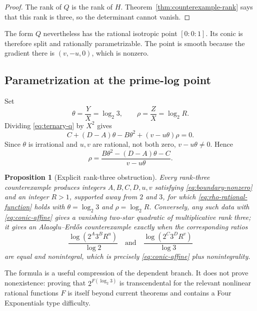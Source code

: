 \documentclass[11pt]{article}
\newtheorem{proposition}[theorem]{Proposition}
\theoremstyle{definition}
\theoremstyle{remark}
\begin{document}
\begin{proof}
The rank of $Q$ is the rank of $H$.  Theorem~\ref{thm:counterexample-rank} says that this rank
is three, so the determinant cannot vanish.
\end{proof}

The form $Q$ nevertheless has the rational isotropic point $[0:0:1]$.  Its conic is therefore
split and rationally parametrizable.  The point is smooth because the gradient there is
$(v,-u,0)$, which is nonzero.

\subsection{Parametrization at the prime-log point}

Set
\[
 \theta=\frac{Y}{X}=\log_2 3,
 \qquad
 \rho=\frac{Z}{X}=\log_2 R.
\]
Dividing \eqref{eq:ternary-q} by $X^2$ gives
\begin{equation}
 C+(D-A)\theta-B\theta^2+(v-u\theta)\rho=0.
 \label{eq:conic-affine}
\end{equation}
Since $\theta$ is irrational and $u,v$ are rational, not both zero,
$v-u\theta\ne0$.  Hence
\begin{equation}
 \rho=
 \frac{B\theta^2-(D-A)\theta-C}{v-u\theta}.
 \label{eq:rho-rational-function}
\end{equation}

\begin{proposition}[Explicit rank-three obstruction]
\label{prop:rank-three-obstruction}
Every rank-three counterexample produces integers $A,B,C,D,u,v$ satisfying
\eqref{eq:boundary-nonzero} and an integer $R>1$, supported away from $2$ and $3$, for which
\eqref{eq:rho-rational-function} holds with
$\theta=\log_2 3$ and $\rho=\log_2 R$.
Conversely, any such data with \eqref{eq:conic-affine} gives a vanishing two-star quadratic
of multiplicative rank three; it gives an Alaoglu--Erd\H{o}s counterexample exactly when the
corresponding ratios
\[
 \frac{\log(2^A3^BR^u)}{\log2}
 \quad\text{and}\quad
 \frac{\log(2^C3^DR^v)}{\log3}
\]
are equal and nonintegral, which is precisely \eqref{eq:conic-affine} plus nonintegrality.
\end{proposition}

The formula is a useful compression of the dependent branch.  It does not prove
nonexistence: proving that $2^{F(\log_2 3)}$ is transcendental for the relevant nonlinear
rational functions $F$ is itself beyond current theorems and contains a Four Exponentials
type difficulty.
\end{document}
